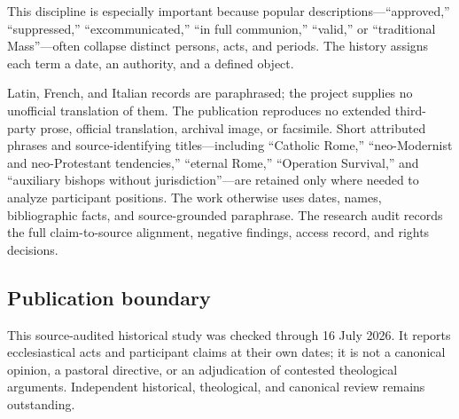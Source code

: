 
This discipline is especially important because popular descriptions---``approved,'' ``suppressed,'' ``excommunicated,'' ``in full communion,'' ``valid,'' or ``traditional Mass''---often collapse distinct persons, acts, and periods. The history assigns each term a date, an authority, and a defined object.

Latin, French, and Italian records are paraphrased; the project supplies no unofficial translation of them. The publication reproduces no extended third-party prose, official translation, archival image, or facsimile. Short attributed phrases and source-identifying titles---including ``Catholic Rome,'' ``neo-Modernist and neo-Protestant tendencies,'' ``eternal Rome,'' ``Operation Survival,'' and ``auxiliary bishops without jurisdiction''---are retained only where needed to analyze participant positions. The work otherwise uses dates, names, bibliographic facts, and source-grounded paraphrase. The research audit records the full claim-to-source alignment, negative findings, access record, and rights decisions.

\subsection{Publication boundary}

This source-audited historical study was checked through 16 July 2026. It reports ecclesiastical acts and participant claims at their own dates; it is not a canonical opinion, a pastoral directive, or an adjudication of contested theological arguments. Independent historical, theological, and canonical review remains outstanding.
